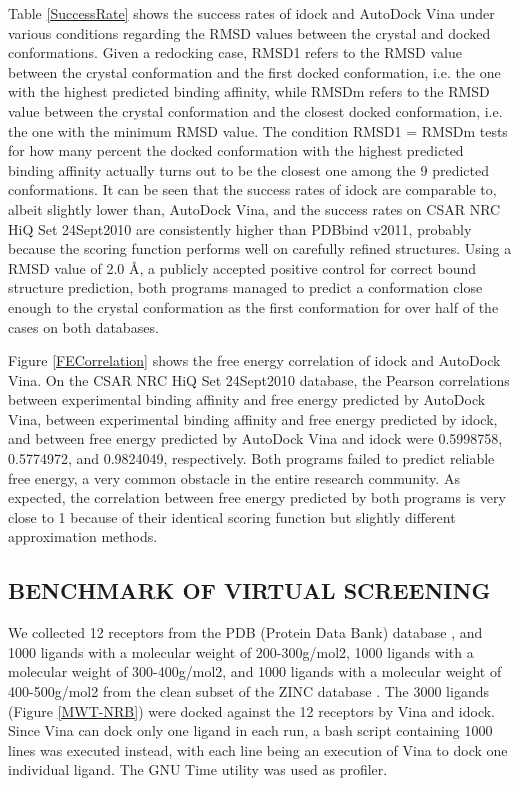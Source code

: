 \documentclass[12pt]{article}
\begin{document}
Table \ref{SuccessRate} shows the success rates of idock and AutoDock Vina under various conditions regarding the RMSD values between the crystal and docked conformations. Given a redocking case, RMSD1 refers to the RMSD value between the crystal conformation and the first docked conformation, i.e. the one with the highest predicted binding affinity, while RMSDm refers to the RMSD value between the crystal conformation and the closest docked conformation, i.e. the one with the minimum RMSD value. The condition RMSD1 = RMSDm tests for how many percent the docked conformation with the highest predicted binding affinity actually turns out to be the closest one among the 9 predicted conformations. It can be seen that the success rates of idock are comparable to, albeit slightly lower than, AutoDock Vina, and the success rates on CSAR NRC HiQ Set 24Sept2010 are consistently higher than PDBbind v2011, probably because the scoring function performs well on carefully refined structures. Using a RMSD value of 2.0 \AA, a publicly accepted positive control for correct bound structure prediction, both programs managed to predict a conformation close enough to the crystal conformation as the first conformation for over half of the cases on both databases.

Figure \ref{FECorrelation} shows the free energy correlation of idock and AutoDock Vina. On the CSAR NRC HiQ Set 24Sept2010 database, the Pearson correlations between experimental binding affinity and free energy predicted by AutoDock Vina, between experimental binding affinity and free energy predicted by idock, and between free energy predicted by AutoDock Vina and idock were 0.5998758, 0.5774972, and 0.9824049, respectively. Both programs failed to predict reliable free energy, a very common obstacle in the entire research community. As expected, the correlation between free energy predicted by both programs is very close to 1 because of their identical scoring function but slightly different approximation methods.

\subsection*{\sffamily \large BENCHMARK OF VIRTUAL SCREENING}

We collected 12 receptors from the PDB (Protein Data Bank) database \cite{540,537}, and 1000 ligands with a molecular weight of 200-300g/mol2, 1000 ligands with a molecular weight of 300-400g/mol2, and 1000 ligands with a molecular weight of 400-500g/mol2 from the clean subset of the ZINC database \cite{532,1178}. The 3000 ligands (Figure \ref{MWT-NRB}) were docked against the 12 receptors by Vina and idock. Since Vina can dock only one ligand in each run, a bash script containing 1000 lines was executed instead, with each line being an execution of Vina to dock one individual ligand. The GNU Time utility was used as profiler.
\end{document}
